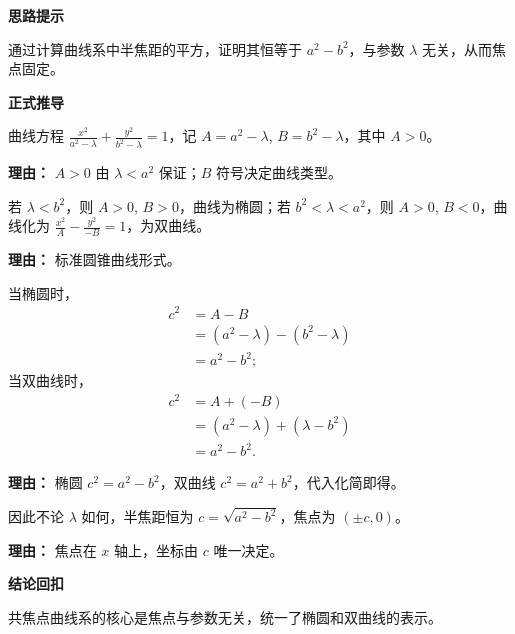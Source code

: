 \begin{proofbox}
	\textbf{\textcolor{CProof}{思路提示}}

	\medskip
	通过计算曲线系中半焦距的平方，证明其恒等于 $a^{2}-b^{2}$，与参数 $\lambda$ 无关，从而焦点固定。

	\medskip
	\textbf{\textcolor{CProof}{正式推导}}
	\begin{description}[style=nextline,leftmargin=2.8em,labelsep=0.5em,itemsep=0.55em]
		\item[\textbf{步骤一（分母分析）：}]
			曲线方程 $\frac{x^{2}}{a^{2}-\lambda}+\frac{y^{2}}{b^{2}-\lambda}=1$，记 $A=a^{2}-\lambda$, $B=b^{2}-\lambda$，其中 $A>0$。
			\par\textbf{理由：} $A>0$ 由 $\lambda<a^{2}$ 保证；$B$ 符号决定曲线类型。
		\item[\textbf{步骤二（类型判定）：}]
			若 $\lambda<b^{2}$，则 $A>0$, $B>0$，曲线为椭圆；若 $b^{2}<\lambda<a^{2}$，则 $A>0$, $B<0$，曲线化为 $\frac{x^{2}}{A}-\frac{y^{2}}{-B}=1$，为双曲线。
			\par\textbf{理由：} 标准圆锥曲线形式。
		\item[\textbf{步骤三（半焦距计算）：}]
			当椭圆时，
			\[
				\begin{aligned}
					c^{2}&=A-B\\ &=(a^{2}-\lambda)-(b^{2}-\lambda)\\ &=a^{2}-b^{2};
			\end{aligned}
			\]
			当双曲线时，
			\[
				\begin{aligned}
					c^{2}&=A+(-B)\\ &=(a^{2}-\lambda)+(\lambda-b^{2})\\ &=a^{2}-b^{2}.
			\end{aligned}
			\]
			\par\textbf{理由：} 椭圆 $c^{2}=a^{2}-b^{2}$，双曲线 $c^{2}=a^{2}+b^{2}$，代入化简即得。
		\item[\textbf{步骤四（焦点结论）：}]
			因此不论 $\lambda$ 如何，半焦距恒为 $c=\sqrt{a^{2}-b^{2}}$，焦点为 $(\pm c,0)$。
			\par\textbf{理由：} 焦点在 $x$ 轴上，坐标由 $c$ 唯一决定。
	\end{description}

	\medskip
	\textbf{\textcolor{CProof}{结论回扣}}

	\medskip
	共焦点曲线系的核心是焦点与参数无关，统一了椭圆和双曲线的表示。
\end{proofbox}
